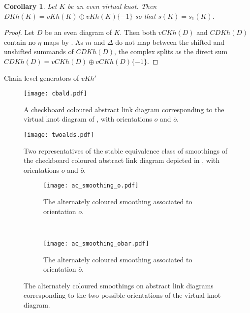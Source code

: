 \documentclass[10pt,oneside]{amsart}
\newtheorem{corollary}[theorem]{Corollary}
\theoremstyle{definition}
\numberwithin{equation}{section}
\begin{document}
\begin{corollary}
	\label{Cor:evenknots}
	Let \( K \) be an even virtual knot. Then \( DKh ( K ) = vKh ( K ) \oplus vKh ( K ) \lbrace -1 \rbrace \) so that \( s ( K ) = s_1 ( K ) \).
\end{corollary}

\begin{proof}
	Let \( D \) be an even diagram of \( K \). Then both \( vCKh ( D ) \) and \( CDKh ( D ) \) contain no \( \eta \) maps by . As \( m \) and \( \Delta \) do not map between the shifted and unshifted summands of \( CDKh ( D ) \), the complex splits as the direct sum \( CDKh ( D ) = vCKh ( D ) \oplus vCKh ( D ) \lbrace -1 \rbrace \).
\end{proof}

{	\z@{-1.2\linespacing\@plus-.5\linespacing}{.8\linespacing}	{\normalfont\bfseries\Large}}{Chain-level generators of \( vKh ' \)}\label{Sec:cangen}
\begin{figure}
	\texttt{[image: cbald.pdf]}
	\caption{A checkboard coloured abstract link diagram corresponding to the virtual knot diagram of , with orientations \( o \) and \( \overline{o} \).}
	\label{Fig:cb_K}
\end{figure}
\begin{figure}
	\texttt{[image: twoalds.pdf]}
	\caption{Two representatives of the stable equivalence class of smoothings of the checkboard coloured abstract link diagram depicted in , with orientations  \( o \) and \( \overline{o} \).}
	\label{Fig:cb_smooth}
\end{figure}
\begin{figure}
	\centering
	\begin{subfigure}[b]{0.4\textwidth}
		\begin{center}
			\texttt{[image: ac\_smoothing\_o.pdf]}
			\caption{The alternately coloured smoothing associated to orientation \( o \).}
			\label{Fig:ac_smoothing_o}
		\end{center}
	\end{subfigure}
	~
	\begin{subfigure}[b]{0.4\textwidth}
		\begin{center}
			\texttt{[image: ac\_smoothing\_obar.pdf]}
			\caption{The alternately coloured smoothing associated to orientation \( \overline{o} \).}
			\label{Fig:ac_smoothing_obar}
		\end{center}
	\end{subfigure}
	\caption{The alternately coloured smoothings on abstract link diagrams corresponding to the two possible orientations of the virtual knot diagram.}\label{Fig:alternatesmoothings}
\end{figure}
\end{document}

